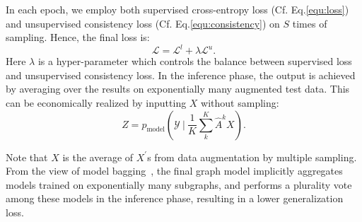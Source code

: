 {{In each epoch, we employ both supervised cross-entropy loss (Cf. Eq.\ref{equ:loss}) and unsupervised consistency loss (Cf. Eq.\ref{equ:consistency}) on $S$ times of sampling. Hence, the final loss is:
\begin{equation}
\label{equ:inf}
	\mathcal{L} = \mathcal{L}^l + \lambda \mathcal{L}^u.
\end{equation}
Here $\lambda$ is a hyper-parameter which controls the balance between supervised loss and unsupervised consistency loss.
In the inference phase, the output is achieved by averaging  over the results on exponentially many augmented test data. This can be economically realized by inputting $X$ without sampling:
\begin{equation}
\label{equ:inference}
Z= p_{\text{model}}\left(\mathcal{Y}~\bigg|~\frac{1}{K}\sum_k^K\hat{A}^k X\right).
\end{equation}

Note that $X$ is the average of $X^{'}$s from data augmentation by multiple sampling. From the view of model bagging~\cite{breiman1996bagging}, the final graph model implicitly aggregates models trained on exponentially many subgraphs, and performs a plurality vote among these models in the inference phase, resulting in a lower generalization loss.  
}






}
